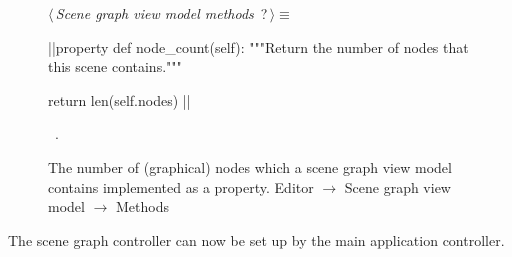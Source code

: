 \documentclass[%
    a4paper,    %
    justified,  %
    nobib,      %
    openany     %
]{tufte-book}
\begin{document}
\begin{figure}
\begin{flushleft} \small
\begin{minipage}{\linewidth}\label{scrap38}\raggedright\small
{} $\langle\,${\itshape Scene graph view model methods}\nobreak\ {\footnotesize {?}}$\,\rangle\equiv$
\vspace{-1ex}
\begin{pythoncode}
|\normalfont{}\fontfamily{}|property
def node_count(self):
    """Return the number of nodes that this scene contains."""

    return len(self.nodes)
|\NWsep|
\end{pythoncode}
\vspace{1.5ex}
\footnotesize
\begin{list}{}{\setlength{\itemsep}{-\parsep}\setlength{\itemindent}{-\leftmargin}}
\item \NWtxtMacroRefIn\ .

\item{}
\end{list}
\end{minipage}\vspace{4ex}
\end{flushleft}
\caption{The number of (graphical) nodes which a scene graph view model contains
  implemented as a property.
  \newline{}\newline{}Editor $\rightarrow$ Scene graph view model $\rightarrow$
  Methods}
\label{editor:lst:scene-graph-view-model:methods:node-count}
\end{figure}


The scene graph controller can now be set up by the main application controller.
\end{document}
